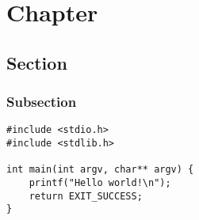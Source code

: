 \documentclass[a4paper, 12pt]{report}
\begin{document}
\maketitle
\tableofcontents
\newpage


\chapter{Chapter}
\section{Section}
\subsection{Subsection}

\begin{lstlisting}[label=etape-1,caption=Etape 1]
#include <stdio.h>
#include <stdlib.h>

int main(int argv, char** argv) {
	printf("Hello world!\n");
	return EXIT_SUCCESS;
}
\end{lstlisting}
\end{document}
